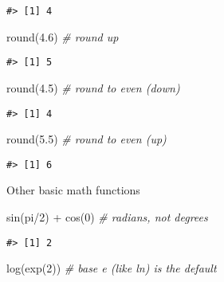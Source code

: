 \documentclass[
]{book}
\newenvironment{Shaded}{\begin{snugshade}}{\end{snugshade}}
\newcommand{\CommentTok}[1]{\textcolor[rgb]{0.56,0.35,0.01}{\textit{#1}}}
\newcommand{\DecValTok}[1]{\textcolor[rgb]{0.00,0.00,0.81}{#1}}
\newcommand{\FloatTok}[1]{\textcolor[rgb]{0.00,0.00,0.81}{#1}}
\newcommand{\FunctionTok}[1]{\textcolor[rgb]{0.00,0.00,0.00}{#1}}
\newcommand{\NormalTok}[1]{#1}
\newcommand{\SpecialCharTok}[1]{\textcolor[rgb]{0.00,0.00,0.00}{#1}}
\begin{document}
\begin{verbatim}
#> [1] 4
\end{verbatim}

\begin{Shaded}
\begin{Highlighting}[]
\FunctionTok{round}\NormalTok{(}\FloatTok{4.6}\NormalTok{) }\CommentTok{\# round up}
\end{Highlighting}
\end{Shaded}

\begin{verbatim}
#> [1] 5
\end{verbatim}

\begin{Shaded}
\begin{Highlighting}[]
\FunctionTok{round}\NormalTok{(}\FloatTok{4.5}\NormalTok{) }\CommentTok{\# round to even (down)}
\end{Highlighting}
\end{Shaded}

\begin{verbatim}
#> [1] 4
\end{verbatim}

\begin{Shaded}
\begin{Highlighting}[]
\FunctionTok{round}\NormalTok{(}\FloatTok{5.5}\NormalTok{) }\CommentTok{\# round to even (up)}
\end{Highlighting}
\end{Shaded}

\begin{verbatim}
#> [1] 6
\end{verbatim}

Other basic math functions

\begin{Shaded}
\begin{Highlighting}[]
\FunctionTok{sin}\NormalTok{(pi}\SpecialCharTok{/}\DecValTok{2}\NormalTok{) }\SpecialCharTok{+} \FunctionTok{cos}\NormalTok{(}\DecValTok{0}\NormalTok{) }\CommentTok{\# radians, not degrees}
\end{Highlighting}
\end{Shaded}

\begin{verbatim}
#> [1] 2
\end{verbatim}

\begin{Shaded}
\begin{Highlighting}[]
\FunctionTok{log}\NormalTok{(}\FunctionTok{exp}\NormalTok{(}\DecValTok{2}\NormalTok{)) }\CommentTok{\# base e (like ln) is the default}
\end{Highlighting}
\end{Shaded}
\end{document}

